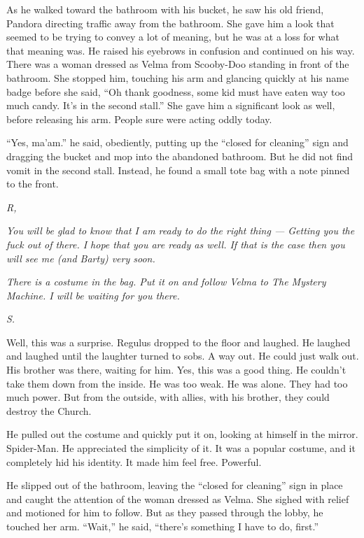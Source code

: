 \documentclass[12pt,twoside,openright]{memoir}
\begin{document}
As he walked toward the bathroom with his bucket, he saw his old friend, Pandora directing traffic away from the bathroom. She gave him a look that seemed to be trying to convey a lot of meaning, but he was at a loss for what that meaning was. He raised his eyebrows in confusion and continued on his way. There was a woman dressed as Velma from Scooby-Doo standing in front of the bathroom. She stopped him, touching his arm and glancing quickly at his name badge before she said, ``Oh thank goodness, some kid must have eaten way too much candy. It's in the second stall.'' She gave him a significant look as well, before releasing his arm. People sure were acting oddly today.

``Yes, ma'am.'' he said, obediently, putting up the ``closed for cleaning'' sign and dragging the bucket and mop into the abandoned bathroom. But he did not find vomit in the second stall. Instead, he found a small tote bag with a note pinned to the front. 

\textit{\newline R,} 

\textit{You will be glad to know that I am ready to do the right thing --- Getting you the fuck out of there. I hope that you are ready as well. If that is the case then you will see me (and Barty) very soon. }

\textit{There is a costume in the bag. Put it on and follow Velma to The Mystery Machine. I will be waiting for you there.} 

\textit{S.}

Well, this was a surprise. Regulus dropped to the floor and laughed. He laughed and laughed until the laughter turned to sobs. A way out. He could just walk out. His brother was there, waiting for him. Yes, this was a good thing. He couldn't take them down from the inside. He was too weak. He was alone. They had too much power. But from the outside, with allies, with his brother, they could destroy the Church. 

He pulled out the costume and quickly put it on, looking at himself in the mirror. Spider-Man. He appreciated the simplicity of it. It was a popular costume, and it completely hid his identity. It made him feel free. Powerful.

He slipped out of the bathroom, leaving the ``closed for cleaning'' sign in place and caught the attention of the woman dressed as Velma. She sighed with relief and motioned for him to follow. But as they passed through the lobby, he touched her arm. ``Wait,'' he said, ``there's something I have to do, first.'' 
\end{document}

